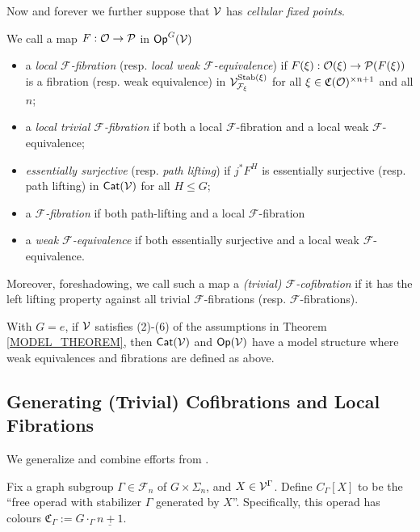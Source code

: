 \documentclass[a4paper,10pt
,draft
]{article}%
\renewcommand{\F}{\mathcal F}
\renewcommand{\1}{\ensuremath{\mathbb{id}}}
\begin{document}
Now and forever we further suppose that $\mathcal V$ has \textit{cellular fixed points}.

\begin{definition}
      We call a map $F: \mathcal{O} \to \mathcal{P}$ in $\mathsf{Op}^G(\mathcal V)$
      \begin{itemize}
      \item a {\em local $\F$-fibration} (resp. {\em local weak $\F$-equivalence}) if
            $F(\xi): \mathcal{O}(\xi)\to \mathcal{P}(F(\xi))$
            is a fibration (resp. weak equivalence) in $\V^{\Stab(\xi)}_{\F_\xi}$ for all $\xi\in \mathfrak C(\mathcal{O})^{\times n+1}$ and all $n$;
      \item a {\em local trivial $\F$-fibration} if both a local $\F$-fibration and a local weak $\F$-equivalence;
      \item {\em essentially surjective} (resp. {\em path lifting}) if $j^*F^H$ is essentially surjective (resp. path lifting) in $\mathsf{Cat}(\mathcal V)$ for all $H\leq G$;
      \item a {\em $\F$-fibration} if both path-lifting and a local $\F$-fibration
      \item a {\em weak $\F$-equivalence} if both essentially surjective and a local weak $\F$-equivalence.
      \end{itemize}

      Moreover, foreshadowing, we call such a map
      a \textit{(trivial) $\F$-cofibration} if it has the left lifting property against all trivial $\F$-fibrations (resp. $\F$-fibrations).
\end{definition}

\begin{theorem}
      With $G = e$, if $\mathcal V$ satisfies (2)-(6) of the assumptions in Theorem \ref{MODEL_THEOREM}, then
      $\mathsf{Cat}(\mathcal V)$ and $\mathsf{Op}(\mathcal V)$ have a model structure where weak equivalences and fibrations are defined as above.
\end{theorem}


\subsection{Generating (Trivial) Cofibrations and Local Fibrations}

We generalize and combine efforts from \cite{CM13b, BM13, Cav14}.

Fix a graph subgroup $\Gamma \in \F_n$ of $G \times \Sigma_n$, and $X \in \mathcal V^\Gamma$.
Define $C_\Gamma[X]$ to be the ``free operad with stabilizer $\Gamma$ generated by $X$''.
Specifically, this operad has colours $\mathfrak C_\Gamma := G \cdot_\Gamma \underline{n+1}$.
\end{document}
